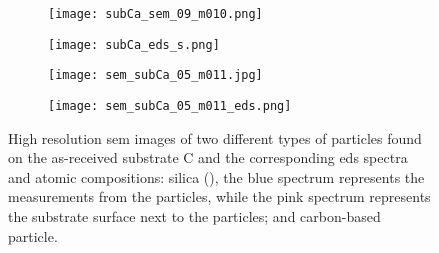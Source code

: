 \begin{figure}
    \centering
    \begin{subfigure}[t]{\textwidth}
        \caption{}\label{fig:subCa_polishing-grit}
          \begin{minipage}[t]{0.43\linewidth}
            \centering
            \texttt{[image: subCa\_sem\_09\_m010.png]}
          \end{minipage}
          \hfill
          \begin{minipage}[t]{0.43\linewidth}
            \centering
            \texttt{[image: subCa\_eds\_s.png]}
          \end{minipage}
          \begin{minipage}[t]{0.11\linewidth}
            \centering
            \atomicTable[&][&][&]
          \end{minipage}
    \end{subfigure}%
    \par\bigskip
    \begin{subfigure}[t]{\textwidth}
        \caption{}\label{fig:subCa_carbon-based}
          \begin{minipage}[t]{0.43\linewidth}
            \centering
            \texttt{[image: sem\_subCa\_05\_m011.jpg]}
          \end{minipage}
          \hfill
          \begin{minipage}[t]{0.43\linewidth}
            \centering
            \texttt{[image: sem\_subCa\_05\_m011\_eds.png]}
          \end{minipage}
          \begin{minipage}[t]{0.11\linewidth}
            \centering
            \atomicTable[&][&][&]
          \end{minipage}
    \end{subfigure}%
    \caption[\Ac{sem} images, \ac{eds} spectra, and \ac{eds} atomic compositions of two different types of particles found on as-received substrate C.]{High resolution \ac{sem} images of two different types of particles found on the as-received substrate C and the corresponding \ac{eds} spectra and atomic compositions:  silica (), the blue spectrum represents the measurements from the particles, while the pink spectrum represents the substrate surface next to the particles; and  carbon-based particle.}\label{fig:subCa_sem_w_eds}
\end{figure}

